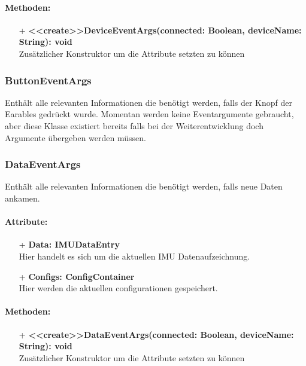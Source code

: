 \documentclass[a4paper,12pt]{article}
\begin{document}
\paragraph{Methoden:}
\begin{itemize}
	\item[+] \textbf{<<create>>DeviceEventArgs(connected: Boolean, deviceName: String): void}\\Zusätzlicher Konstruktor um die Attribute setzten zu können
\end{itemize}


\subsubsection{ButtonEventArgs}
Enthält alle relevanten Informationen die benötigt werden, falls der Knopf der Earables gedrückt wurde. Momentan werden keine Eventargumente gebraucht, aber diese Klasse existiert bereits falls bei der Weiterentwicklung doch Argumente übergeben werden müssen.


\subsubsection{DataEventArgs}
Enthält alle relevanten Informationen die benötigt werden, falls neue Daten ankamen.

\paragraph{Attribute:}
\begin{itemize}
	\item[+] \textbf{Data: IMUDataEntry}\\Hier handelt es sich um die aktuellen IMU Datenaufzeichnung.
	\item[+] \textbf{Configs: ConfigContainer}\\Hier werden die aktuellen configurationen gespeichert.
\end{itemize}

\paragraph{Methoden:}
\begin{itemize}
	\item[+] \textbf{<<create>>DataEventArgs(connected: Boolean, deviceName: String): void}\\Zusätzlicher Konstruktor um die Attribute setzten zu können
\end{itemize}
\end{document}
